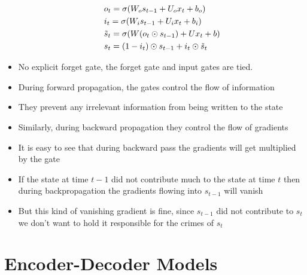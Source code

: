 \documentclass[a4paper]{article}
\begin{document}
\begin{itemize}
    \begin{equation*}
        \begin{split}
            &o_t=\sigma(W_os_{t-1}+U_ox_t+b_o)\\
            &i_t=\sigma(W_is_{t-1}+U_ix_t+b_i)\\
            &\Tilde{s}_t=\sigma(W(o_t\odot s_{t-1})+Ux_t+b)\\
            &s_t=(1-i_t)\odot s_{t-1}+i_t\odot \Tilde{s}_t
        \end{split}
    \end{equation*}
    \item No explicit forget gate, the forget gate and input gates are tied.
    \item During forward propagation, the gates control the flow of information
    \item They prevent any irrelevant information from being written to the state
    \item Similarly, during backward propagation they control the flow of gradients
    \item It is easy to see that during backward pass the gradients will get multiplied by the gate
    \item If the state at time $t-1$ did not contribute much to the state at time $t$ then during backpropagation the gradients flowing into $s_{t-1}$ will vanish
    \item But this kind of vanishing gradient is fine, since $s_{t-1}$ did not contribute to $s_t$ we don’t want to hold it responsible for the crimes of $s_t$
\end{itemize}

\section{Encoder-Decoder Models}
\end{document}
